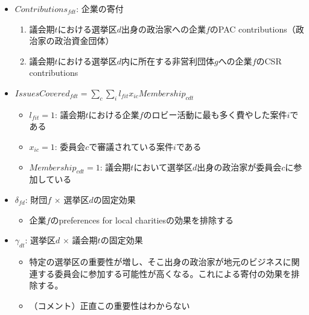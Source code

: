\documentclass[../root]{subfiles}
\begin{document}
    \begin{itemize}
    
    \item
      \(Contributions_{fdt}\): 企業の寄付

      \begin{enumerate}
      \def\labelenumi{\arabic{enumi}.}
      
      \item
        議会期\(t\)における選挙区\(d\)出身の政治家への企業\(f\)のPAC contributions（政治家の政治資金団体）
      \item
        議会期\(t\)における選挙区\(d\)内に所在する非営利団体\(g\)への企業\(f\)のCSR contributions
      \end{enumerate}
    \item
      \(IssuesCovered_{fdt} = \sum_c \sum_i l_{fit} x_{ic} Membership_{cdt}\)

      \begin{itemize}
      
      \item
        \(l_{fit} = 1\): 議会期\(t\)における企業\(f\)のロビー活動に最も多く費やした案件\(i\)である
      \item
        \(x_{ic} = 1\): 委員会\(c\)で審議されている案件\(i\)である
      \item
        \(Membership_{cdt} = 1\): 議会期\(t\)において選挙区\(d\)出身の政治家が委員会\(c\)に参加している
      \end{itemize}
    \item
      \(\delta_{fd}\): 財団\(f\) \(\times\) 選挙区\(d\)の固定効果

      \begin{itemize}
      
      \item
        企業\(f\)のpreferences for local charitiesの効果を排除する
      \end{itemize}
    \item
      \(\gamma_{dt}\): 選挙区\(d\) \(\times\) 議会期\(t\)の固定効果

      \begin{itemize}
      
      \item
        特定の選挙区の重要性が増し、そこ出身の政治家が地元のビジネスに関連する委員会に参加する可能性が高くなる。これによる寄付の効果を排除する。
      \item
        （コメント）正直この重要性はわからない
      \end{itemize}
    \end{itemize}
\end{document}
